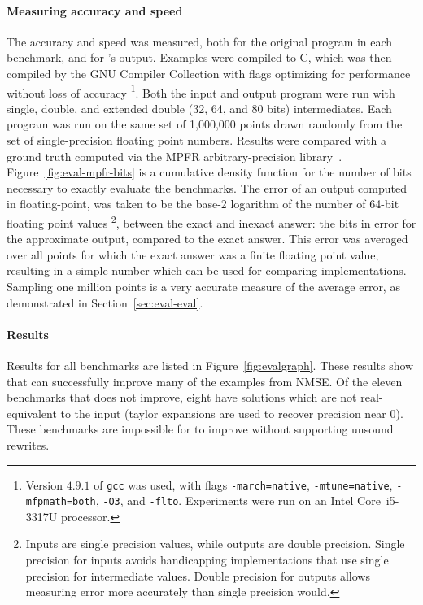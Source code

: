 \documentclass[paper.tex]{subfiles}
\begin{document}
\paragraph{Measuring accuracy and speed}
The accuracy and speed was measured,
  both for the original program in each benchmark,
  and for \casio's output.
Examples were compiled to C,
  which was then compiled by the GNU Compiler Collection
  with flags optimizing for performance without loss of accuracy%
  \footnote{Version $4.9.1$ of \texttt{gcc} was used, with flags
    \texttt{-march=native}, \texttt{-mtune=native},
    \texttt{-mfpmath=both}, \texttt{-O3}, and \texttt{-flto}.
    Experiments were run on an Intel Core~i5-3317U processor.}.
Both the input and output program were run
  with single, double, and extended double (32, 64, and 80 bits)
  intermediates.
Each program was run on the same set of 1,000,000 points
  drawn randomly from the set of single-precision floating point numbers.
Results were compared with a ground truth computed via
  the MPFR arbitrary-precision library~\cite{acm07-mpfr}.
Figure~\ref{fig:eval-mpfr-bits} is a cumulative density function
  for the number of bits necessary to exactly evaluate the benchmarks.
The error of an output computed in floating-point,
  was taken to be the base-2 logarithm of the number
  of 64-bit floating point values%
  \footnote{Inputs are single precision values,
    while outputs are double precision.
    Single precision for inputs avoids handicapping implementations
    that use single precision for intermediate values.
    Double precision for outputs allows measuring error
    more accurately than single precision would.},
  between the exact and inexact answer:
  the bits in error for the approximate output, compared to the exact answer.
This error was averaged over all points for which the exact answer
  was a finite floating point value,
  resulting in a simple number which can be used for comparing implementations.
Sampling one million points
  is a very accurate measure of the average error,
  as demonstrated in Section~\ref{sec:eval-eval}.

\paragraph{Results}
Results for all benchmarks are listed in Figure~\ref{fig:evalgraph}.
These results show that \casio can successfully improve
  many of the examples from NMSE.
Of the eleven benchmarks that \casio does not improve,
  eight have solutions which are not real-equivalent to the input
  (taylor expansions are used to recover precision near 0).
These benchmarks are impossible for \casio to improve
  without supporting unsound rewrites.
\end{document}
